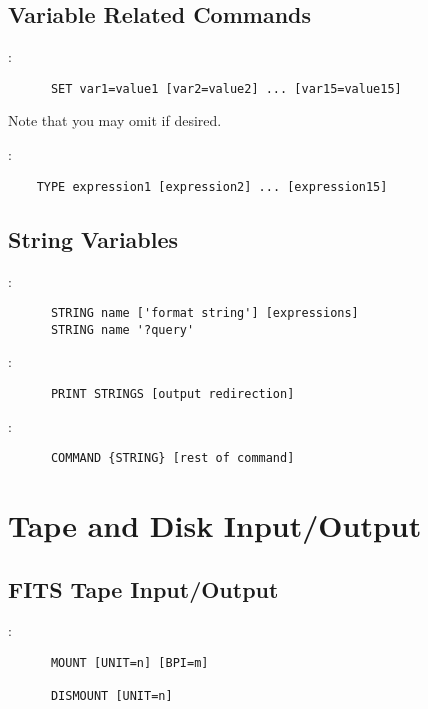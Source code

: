 \subsection{Variable Related Commands}

:
\begin{verbatim}
      SET var1=value1 [var2=value2] ... [var15=value15]
\end{verbatim}
Note that you may omit  if desired.

\noindent {}:
\begin{verbatim}
	TYPE expression1 [expression2] ... [expression15]
\end{verbatim}

\subsection{String Variables}

:
\begin{verbatim}
      STRING name ['format string'] [expressions]
      STRING name '?query'
\end{verbatim}

\noindent {}:
\begin{verbatim}
      PRINT STRINGS [output redirection]
\end{verbatim}

\noindent {}:
\begin{verbatim}
      COMMAND {STRING} [rest of command]
\end{verbatim}


\section{Tape and Disk Input/Output}

\subsection{FITS Tape Input/Output}

:
\begin{verbatim}
      MOUNT [UNIT=n] [BPI=m]

      DISMOUNT [UNIT=n]
\end{verbatim}

